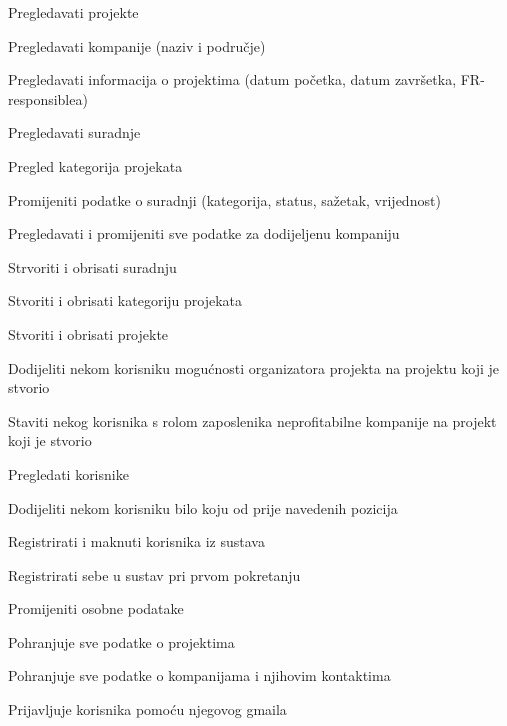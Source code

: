 \begin{packed_enum}
\begin{packed_enum}
				\end{packed_enum}

				\item  {}

				\begin{packed_enum}

					\item Pregledavati projekte
					\item Pregledavati kompanije (naziv i područje)
					\item Pregledavati informacija o projektima (datum početka, datum završetka, FR-responsiblea)
					\item Pregledavati suradnje
					\item Pregled kategorija projekata
					\item Promijeniti podatke o suradnji (kategorija, status, sažetak, vrijednost)
					\item Pregledavati i promijeniti sve podatke za dodijeljenu kompaniju
					\item Strvoriti i obrisati suradnju
					\item Stvoriti i obrisati kategoriju projekata
					\item Stvoriti i obrisati projekte
					\item Dodijeliti nekom korisniku mogućnosti organizatora projekta na projektu koji je stvorio
					\item Staviti nekog korisnika s rolom zaposlenika neprofitabilne kompanije na projekt koji je stvorio
					\item Pregledati korisnike
					\item Dodijeliti nekom korisniku bilo koju od prije navedenih pozicija
					\item Registrirati i maknuti korisnika iz sustava
					\item Registrirati sebe u sustav pri prvom pokretanju
					\item Promijeniti osobne podatake

				\end{packed_enum}
			
				\item  {}
				
				\begin{packed_enum}
					
					\item Pohranjuje sve podatke o projektima
					\item Pohranjuje sve podatke o kompanijama i njihovim kontaktima
					
				\end{packed_enum}

				\item  {}

				\begin{packed_enum}

					\item Prijavljuje korisnika pomoću njegovog gmaila

				\end{packed_enum}
			\end{packed_enum}
			
